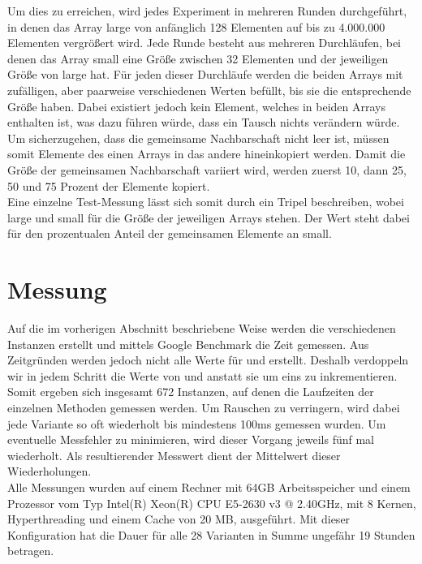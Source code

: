 Um dies zu erreichen, wird jedes Experiment in  mehreren Runden durchgeführt, in denen das Array large von anfänglich 128
Elementen auf bis zu 4.000.000 Elementen vergrößert wird. 
Jede Runde besteht aus mehreren Durchläufen, bei denen das Array small eine Größe zwischen 32 Elementen und der jeweiligen Größe von large hat.
Für jeden dieser Durchläufe werden die beiden Arrays mit zufälligen, aber paarweise verschiedenen
Werten befüllt, bis sie die entsprechende Größe haben. 
Dabei existiert jedoch kein Element, welches in beiden Arrays 
enthalten ist, was dazu führen würde, dass ein \gc{} 
Tausch nichts verändern würde. Um sicherzugehen,
dass die gemeinsame Nachbarschaft nicht leer ist, müssen somit Elemente des einen Arrays 
in das andere hineinkopiert werden. Damit die Größe der gemeinsamen Nachbarschaft
variiert wird, werden zuerst 10, dann 25, 50 und 75 Prozent der Elemente kopiert. 
\\

Eine einzelne Test-Messung lässt sich somit durch ein Tripel \fett{(\la, \sm, \fr)} beschreiben, wobei
large  und small für die Größe der jeweiligen Arrays stehen.
Der Wert \fett{\fr} steht dabei für den prozentualen Anteil der gemeinsamen Elemente an small.






\section{Messung}
\label{sec:messung}
Auf die im vorherigen Abschnitt beschriebene Weise werden die verschiedenen Instanzen erstellt und
mittels Google Benchmark die Zeit gemessen. Aus Zeitgründen werden jedoch nicht alle Werte 
für \la{} und \sm{} erstellt. Deshalb verdoppeln wir in jedem Schritt die Werte von \la{} und \sm{,}
anstatt sie um eins zu inkrementieren. Somit ergeben sich insgesamt 672 Instanzen, auf denen die Laufzeiten der 
einzelnen Methoden gemessen werden. 
Um Rauschen zu verringern, wird dabei jede Variante so oft wiederholt
 bis mindestens 100ms gemessen wurden.
Um eventuelle Messfehler zu minimieren, wird
dieser Vorgang jeweils fünf mal wiederholt. 
Als resultierender Messwert dient der Mittelwert dieser Wiederholungen.
\\

Alle Messungen wurden auf einem Rechner mit 64GB Arbeitsspeicher und einem Prozessor vom Typ Intel(R) Xeon(R) CPU E5-2630 v3 @ 2.40GHz,
mit 8 Kernen, Hyperthreading und einem Cache von 20 MB, ausgeführt.
Mit dieser Konfiguration hat die Dauer für alle 28 Varianten in Summe ungefähr 19 Stunden betragen.




